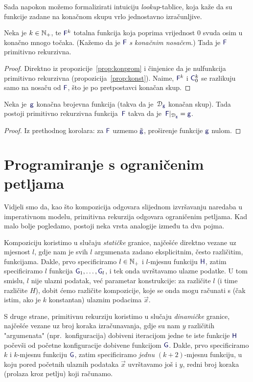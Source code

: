 Sada napokon možemo formalizirati intuiciju \emph{lookup}-tablice, koja kaže da su funkcije zadane na konačnom skupu vrlo jednostavno izračunljive.

\begin{korolar}\label{kor:konprom0}
Neka je $k\in{\mathbb N}_+$, te $\f F^k$ totalna funkcija koja poprima vrijednost $0$ svuda osim u konačno mnogo točaka. (Kažemo da je $\f F$ \emph{s konačnim nosačem}.) Tada je $\f F$ primitivno rekurzivna.
\end{korolar}
\begin{proof}
Direktno iz propozicije~\ref{prop:konprom} i činjenice da je nulfunkcija primitivno rekurzivna (propozicija~\ref{prop:konst}). Naime, $\f F^k$ i $\f C_0^k$ se razlikuju samo na nosaču od $\f F$, što je po pretpostavci konačan skup.
\end{proof}

\begin{korolar}\label{kor:kon0}
Neka je\, $\f g$ konačna brojevna funkcija (takva da je\, $\dom{\f g}$ konačan skup). Tada postoji primitivno rekurzivna funkcija\, $\f F$ takva da je\, $\f F|_{\dom{\f g}}=\f g$.
\end{korolar}
\begin{proof}
    Iz prethodnog korolara: za $\f F$ uzmemo $\tilde{\f g}$, proširenje funkcije $\f g$ nulom.
\end{proof}

\section{Programiranje s ograničenim petljama}\label{sec:dyn}

Vidjeli smo da, kao što kompozicija odgovara slijednom izvršavanju naredaba u imperativnom modelu, primitivna rekurzija odgovara ograničenim petljama. Kad malo bolje pogledamo, postoji neka vrsta analogije između ta dva pojma.

Kompoziciju koristimo u slučaju \emph{statičke} granice, najčešće direktno vezane uz mjesnost $l$, gdje nam je svih $l$ argumenata zadano eksplicitnim, često različitim, funkcijama. Dakle, prvo specificiramo $l\in{\mathbb N}_+$ i $l$-mjesnu funkciju $\f H$, zatim specificiramo $l$ funkcija $\f G_1,\dotsc,\f G_l$, i tek onda uvrštavamo ulazne podatke. U tom smislu, $l$ nije ulazni podatak, već parametar konstrukcije: za različite $l$ (i time različite $H$), dobit ćemo različite kompozicije, koje se onda mogu računati s (čak istim, ako je $k$ konstantan) ulaznim podacima $\vec x$.

S druge strane, primitivnu rekurziju koristimo u slučaju \emph{dinamičke} granice, naj\-češ\-će vezane uz broj koraka izračunavanja, gdje su nam $y$ različitih "argumenata" (npr.\ konfiguracija) dobiveni iteracijom jedne te iste funkcije $\f H$ počevši od početne konfiguracije dobivene funkcijom $\f G$. Dakle, prvo specificiramo $k$ i $k$-mjesnu funkciju $\f G$, zatim specificiramo \emph{jednu} $(k+2)$-mjesnu funkciju, u koju pored početnih ulaznih podataka $\vec x$ uvrštavamo još i $y$, redni broj koraka (prolaza kroz petlju) koji računamo.

